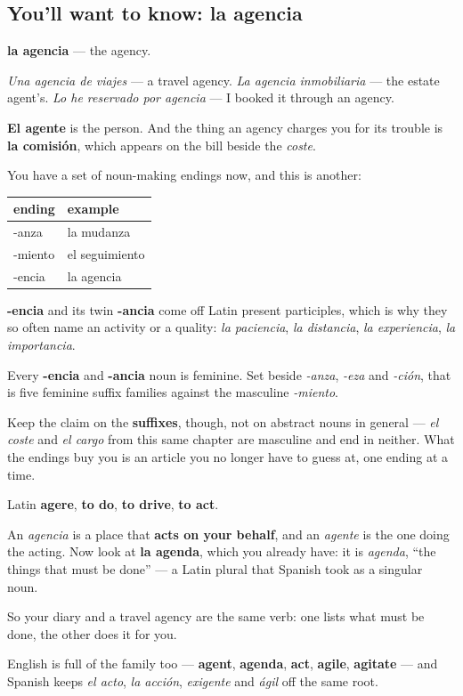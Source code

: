 \subsection*{You'll want to know: la agencia}
\textbf{la agencia} — the agency.

\emph{Una agencia de viajes} — a travel agency. \emph{La agencia inmobiliaria} — the estate agent's. \emph{Lo he reservado por agencia} — I booked it through an agency.

\textbf{El agente} is the person. And the thing an agency charges you for its trouble is \textbf{la comisión}, which appears on the bill beside the \emph{coste}.

\begin{grammarlens}[title={Grammar Lens: -encia names the doing, again}]
You have a set of noun-making endings now, and this is another:

\noindent
\begin{tabularx}{\linewidth}{@{}>{\raggedright\arraybackslash}X>{\raggedright\arraybackslash}X@{}}
\toprule
\textbf{ending} & \textbf{example} \\
\midrule
-anza & la mudanza \\
-miento & el seguimiento \\
-encia & la agencia \\
\bottomrule
\end{tabularx}

\textbf{-encia} and its twin \textbf{-ancia} come off Latin present participles, which is why they so often name an activity or a quality: \emph{la paciencia}, \emph{la distancia}, \emph{la experiencia}, \emph{la importancia}.

Every \textbf{-encia} and \textbf{-ancia} noun is feminine. Set beside \emph{-anza}, \emph{-eza} and \emph{-ción}, that is five feminine suffix families against the masculine \emph{-miento}.

Keep the claim on the \textbf{suffixes}, though, not on abstract nouns in general — \emph{el coste} and \emph{el cargo} from this same chapter are masculine and end in neither. What the endings buy you is an article you no longer have to guess at, one ending at a time.
\end{grammarlens}

\begin{cousinweb}
Latin \textbf{agere}, \textbf{to do}, \textbf{to drive}, \textbf{to act}.

An \emph{agencia} is a place that \textbf{acts on your behalf}, and an \emph{agente} is the one doing the acting. Now look at \textbf{la agenda}, which you already have: it is \emph{agenda}, \textquotedblleft{}the things that must be done\textquotedblright{} — a Latin plural that Spanish took as a singular noun.

So your diary and a travel agency are the same verb: one lists what must be done, the other does it for you.

English is full of the family too — \textbf{agent}, \textbf{agenda}, \textbf{act}, \textbf{agile}, \textbf{agitate} — and Spanish keeps \emph{el acto}, \emph{la acción}, \emph{exigente} and \emph{ágil} off the same root.
\end{cousinweb}

